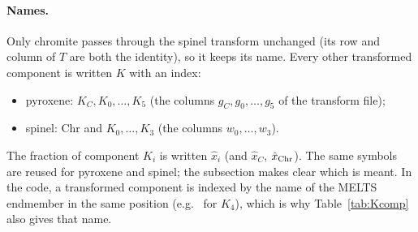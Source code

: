 \documentclass[11pt]{article}
\newcommand{\code}[1]{\texttt{\detokenize{#1}}}
\begin{document}
\paragraph{Names.} Only chromite passes through the spinel transform unchanged (its row and
column of $T$ are both the identity), so it keeps its name. Every other transformed
component is written $K$ with an index:
\begin{itemize}[nosep]
  \item pyroxene: $K_C, K_0, \dots, K_5$ (the columns $g_C, g_0, \dots, g_5$ of the transform
        file);
  \item spinel: Chr and $K_0, \dots, K_3$ (the columns $w_0, \dots, w_3$).
\end{itemize}
The fraction of component $K_i$ is written $\hat x_i$ (and $\hat x_C$, $\hat x_{\rm Chr}$).
The same symbols are reused for pyroxene and spinel; the subsection makes clear which is
meant. In the code, a transformed component is indexed by the name of the MELTS endmember
in the same position (e.g.\ \code{'essenite'} for $K_4$), which is why
Table~\ref{tab:Kcomp} also gives that name.
\end{document}
